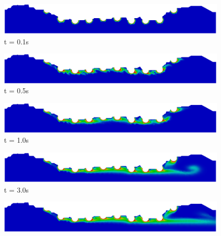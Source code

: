 \begin{figure}[H]
     \begin{minipage}{.50\linewidth}
      \centering
      \includegraphics[scale=0.18]{./02_chaps/cap_solution/figure/conc1000_RealStrut1.png}\\
      t = 0.1s
     \end{minipage}%
     \begin{minipage}{.50\linewidth}
      \centering
      \includegraphics[scale=0.18]{./02_chaps/cap_solution/figure/conc1000_RealStrut2.png}\\
      t = 0.5s
     \end{minipage}
     \begin{minipage}{.50\linewidth}
     \medskip
      \centering
      \includegraphics[scale=0.18]{./02_chaps/cap_solution/figure/conc1000_RealStrut3.png}\\
      t = 1.0s
     \end{minipage}%
     \begin{minipage}{.50\linewidth}
     \medskip
      \centering
      \includegraphics[scale=0.18]{./02_chaps/cap_solution/figure/conc1000_RealStrut4.png}\\
      t = 3.0s
     \end{minipage}
     \begin{minipage}{.50\linewidth}
      \centering
      \includegraphics[scale=0.18]{./02_chaps/cap_solution/figure/conc1000_RealStrut5.png}\\

\end{minipage}
\end{figure}
